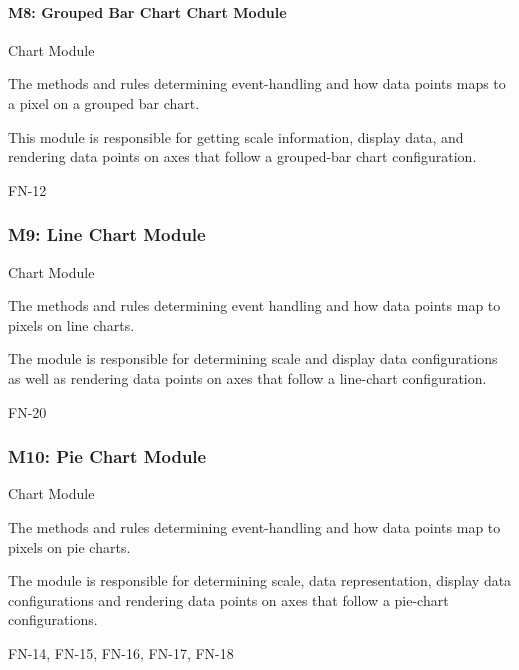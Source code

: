 \documentclass[12pt, titlepage]{article}
\begin{document}
\paragraph{M8: Grouped Bar Chart Chart Module}
\begin{description}[style=nextline]
\item[Type:] Chart Module
\item[Secrets:] The methods and rules determining event-handling and how data points maps to a pixel on a grouped bar chart. 
\item[Responsibilities:]  This module is responsible for getting scale information, display data, and rendering data points on axes that follow a grouped-bar chart configuration.
\item[Requirements:] FN-12
\end{description}


\subsubsection{M9: Line Chart Module}
\begin{description}[style=nextline]
\item[Type:] Chart Module
\item[Secrets:] The methods and rules determining event handling and how data points map to pixels on line charts.
\item[Responsibilities:] The module is responsible for determining scale and display data configurations as well as rendering data points on axes that follow a line-chart configuration. 
\item[Requirements:] FN-20 
\end{description}

\subsubsection{M10: Pie Chart Module}
\begin{description}[style=nextline]
\item[Type:] Chart Module
\item[Secrets:] The methods and rules determining event-handling and how data points map to pixels on pie charts.
\item[Responsibilities:] The module is responsible for determining scale, data representation, display data configurations and rendering data points on axes that follow a pie-chart configurations. 
\item[Requirements:] FN-14, FN-15, FN-16, FN-17, FN-18
\end{description}
\end{document}
